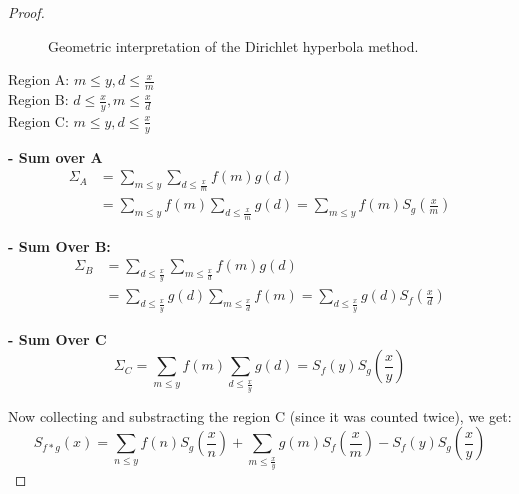 \documentclass[a4paper, 12pt]{article}
\begin{document}
\begin{proof}
\begin{figure}[ht]

\caption{Geometric interpretation of the Dirichlet hyperbola method.}
\end{figure}

\noindent Region A: $m \le y, d \le \frac{x}{m}$ \\
Region B: $d \le \frac{x}{y}, m \le \frac{x}{d}$ \\
Region C: $m \le y, d \le \frac{x}{y}$

\vspace{1em}
\noindent \textbf{- Sum over A} \\
\begin{align*}
    \Sigma_{A} &= \sum_{m\le y}\sum_{d\le\frac{x}{m}}f(m)g(d) \\
    &= \sum_{m\le y}f(m)\sum_{d\le\frac{x}{m}}g(d) = \sum_{m\le y}f(m)S_{g}\left(\frac{x}{m}\right)
\end{align*}

\noindent \textbf{- Sum Over B:} \\
\begin{align*}
    \Sigma_{B} &= \sum_{d\le\frac{x}{y}}\sum_{m\le\frac{x}{d}}f(m)g(d) \\
    &= \sum_{d\le\frac{x}{y}}g(d)\sum_{m\le\frac{x}{d}}f(m) = \sum_{d\le\frac{x}{y}}g(d)S_{f}\left(\frac{x}{d}\right)
\end{align*}

\noindent \textbf{- Sum Over C} \\
\begin{equation*}
    \Sigma_{C} = \sum_{m\le y}f(m)\sum_{d\le\frac{x}{y}}g(d) = S_{f}(y)S_{g}\left(\frac{x}{y}\right)
\end{equation*}

Now collecting and substracting the region C (since it was counted twice), we get:
$$
    S_{f*g}(x) = \sum_{n\le y}f(n)S_{g}\left(\frac{x}{n}\right) + \sum_{m\le\frac{x}{y}}g(m)S_{f}\left(\frac{x}{m}\right) - S_{f}(y)S_{g}\left(\frac{x}{y}\right)
$$
\end{proof}
\end{document}
